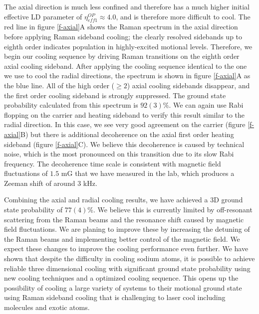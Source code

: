 \documentclass[aps,prl,twocolumn,groupedaddress]{revtex4-1}
\begin{document}
The axial direction is much less confined and therefore has a much higher initial effective
LD parameter of $\eta^{OP}_{eff1}\approx 4.0$, and is therefore more difficult to cool.
The red line in figure \ref{f-axial}A shows the Raman spectrum in the axial direction
before applying Raman sideband cooling; the clearly resolved sidebands
up to eighth order indicates population in highly-excited motional levels.
Therefore, we begin our cooling sequence by driving Raman transitions on the eighth order axial
cooling sideband. After applying the cooling sequence identical to the one we use to cool
the radial directions, the spectrum is shown in figure \ref{f-axial}A as the blue line.
All of the high order ($\geqslant2$) axial cooling sidebands disappear, and the first order
cooling sideband is strongly suppressed.
The ground state probability calculated from this spectrum is $92(3)\%$.
We can again use Rabi flopping on the carrier and heating sideband to verify this result
similar to the radial direction. In this case, we see very good agreement on the carrier
(figure \ref{f-axial}B) but there is additional decoherence on the axial first order
heating sideband (figure \ref{f-axial}C).
We believe this decoherence is caused by technical noise, which is the most pronounced
on this transition due to its slow Rabi frequency.
The decoherence time scale is consistent with magnetic field fluctuations of $1.5$ mG that we have measured in the lab, which produces
a Zeeman shift of around $3$ kHz.

Combining the axial and radial cooling results,
we have achieved a 3D ground state probability of $77(4)\%$.
We believe this is currently limited by off-resonant scattering from the Raman beams
and the resonance shift caused by magnetic field fluctuations.
We are planing to improve these by increasing the detuning of the Raman beams
and implementing better control of the magnetic field.
We expect these changes to improve the cooling performance even further.
We have shown that despite the difficulty in cooling sodium atoms,
it is possible to achieve reliable three dimensional cooling with significant ground state
probability using new cooling techniques and a optimized cooling sequence.
This opens up the possibility of cooling a large variety of systems to their motional ground
state using Raman sideband cooling that is challenging to laser cool
including molecules and exotic atoms.



\end{document}
